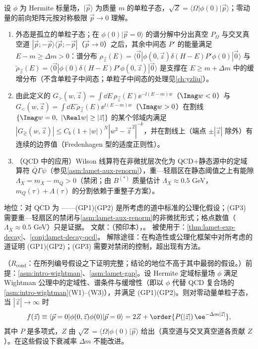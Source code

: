 \begin{assumption}\label{asm:lamet-gap}
设 $\phi$ 为 Hermite 标量场，$|\vec p\rangle$ 为质量 $m$ 的单粒子态，$\sqrt Z=\langle\Omega|\phi(0)|\vec p\rangle$；零动量的前向矩阵元按对称极限 $\vec p\to0$ 理解。
\begin{enumerate}[label=(GP\arabic*),leftmargin=3.2em,itemsep=1pt,topsep=2pt]
\item 外态是孤立的单粒子态；在 $\phi(0)|\vec p=0\rangle$ 的谱分解中分出真空 $P_\Omega$ 与交叉真空道 $|\vec p;-\vec p\rangle\langle\vec p;-\vec p|$（$\vec p\to0$）之后，其余中间态 $P'$ 的能量满足 $E-m\ge\Delta m>0$：谱分布 $\rho_{\vec z}(E)=\langle\vec 0|\phi(0,\vec z)\delta(H-E)P'\phi(0)|\vec 0\rangle$ 与 $\tilde\rho_{\vec z}(E)=\langle\vec 0|\phi(0)\delta(H-E)P'\phi(0,\vec z)|\vec 0\rangle$ 是支撑在 $E\ge m+\Delta m$ 中的缓增分布（不含单粒子中间态；单粒子中间态的处理见\cref{ch:yzliu}）。
\item 由此定义的 $G_>(w,\vec z)=\int\dd E\,\rho_{\vec z}(E)\ee^{-\ii(E-m)w}$（$\Imag w<0$）与 $G_<(w,\vec z)=\int\dd E\,\tilde\rho_{\vec z}(E)\ee^{\ii(E-m)w}$（$\Imag w>0$）在割线 $\{\Imag w=0,\ |\Real w|\ge|\vec z|\}$ 的某个邻域内满足 $|G_\gtrless(w,\vec z)|\le C_b(1+|w|)^N|w^2-\vec z^{\,2}|^{-k}$，并在割线上（端点 $\pm|\vec z|$ 除外）有连续的边界值（Fredenhagen 型的适度正则性）。
\item （QCD 中的应用）Wilson 线算符在非微扰层次化为 QCD$+$静态源中的定域算符 $\bar Q\Gamma\psi$（参见\cref{asm:lamet-aux-renorm}），重—轻扇区在静态阈值之上有能隙 $\Lambda_X=m_X-m_Q>0$（禁闭；由 $B^{(*)}$ 质量估计 $\Lambda_X\approx0.5$ GeV，$m_Q(\tau)+\Lambda(\tau)$ 的分割依赖于重整子方案）。
\end{enumerate}
地位：对 QCD 为 \tagC——(GP1)(GP2) 是所考虑的道中标准的公理化假设；(GP3) 需要重—轻扇区的禁闭与\cref{asm:lamet-aux-renorm}的非微扰形式；格点数值（$\Lambda_X\approx0.5$ GeV）只是证据。
文献：\cite[第~5~节]{Ji:2026vir}（预印本），\cite{Fredenhagen:1984bz}。
被使用于：\cref{thm:lamet-exp-decay}、\cref{conj:lamet-decay-qcd}。
解除途径：在构造性或公理化框架中对所考虑的道证明 (GP1)(GP2)；(GP3) 需要对禁闭的控制，超出现有方法。
\end{assumption}

\begin{theorem}\label{thm:lamet-exp-decay}
（$R_{\mathrm{cond}}$：在所列编号假设之下证明完整；结论的地位不高于其中最弱的假设。）前提：\cref{asm:intro-wightman}、\cref{asm:lamet-gap}。设 Hermite 定域标量场 $\phi$ 满足 Wightman 公理中的定域性、谱条件与缓增性（即以 $\phi$ 代替 QCD 复合场的\cref{asm:intro-wightman}(W1)--(W3)），并满足 (GP1)(GP2)。则对零动量单粒子态，当 $|\vec z|\to\infty$ 时
\begin{equation}\label{eq:lamet-expdecay}
f(\vec z)\equiv\langle\vec p=0|\phi(0,\vec z)\phi(0)|\vec p=0\rangle=2Z+\order{P(|\vec z|)\,\ee^{-\Delta m|\vec z|}},
\end{equation}%
其中 $P$ 是多项式，$Z$ 由 $\sqrt Z=\langle\Omega|\phi(0)|\vec p\rangle$ 给出（真空道与交叉真空道各贡献 $Z$）。在这些假设下衰减率 $\Delta m$ 不能改进。
\end{theorem}


